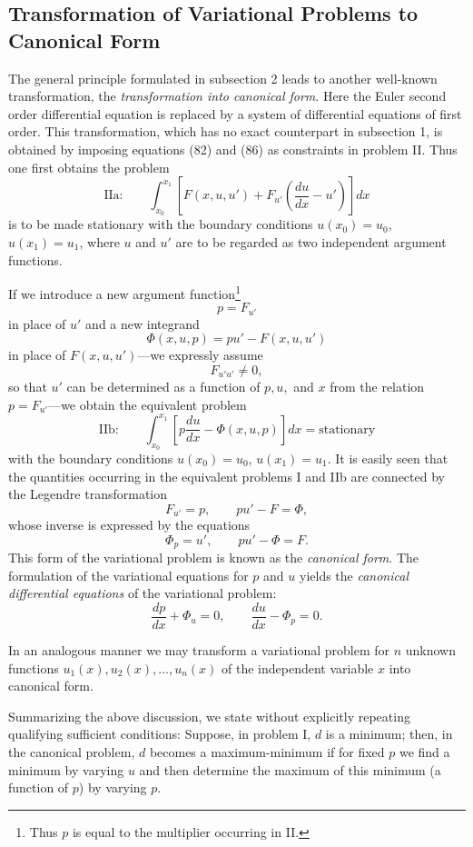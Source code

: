 \subsection{Transformation of Variational Problems to Canonical Form}
The general principle formulated in subsection 2 leads to another well-known transformation, the \emph{transformation into canonical form}. Here the Euler second order differential equation is replaced by a system of differential equations of first order. This transformation, which has no exact counterpart in subsection 1, is obtained by imposing equations (82) and (86) as constraints in problem II. Thus one first obtains the problem
\[
\text{IIa:}\qquad \int_{x_0}^{x_1}\left[F(x,u,u')+F_{u'}\left(\frac{du}{dx}-u'\right)\right]dx
\]
is to be made stationary with the boundary conditions $u(x_0)=u_0$, $u(x_1)=u_1$, where $u$ and $u'$ are to be regarded as two independent argument functions.

If we introduce a new argument function\footnote{Thus $p$ is equal to the multiplier occurring in II.}
\[
p=F_{u'}
\]
in place of $u'$ and a new integrand
\[
\Phi(x,u,p)=pu'-F(x,u,u')
\]
in place of $F(x,u,u')$---we expressly assume
\[
F_{u'u'}\ne0,
\]
so that $u'$ can be determined as a function of $p,u,$ and $x$ from the relation $p=F_{u'}$---we obtain the equivalent problem
\[
\text{IIb:}\qquad \int_{x_0}^{x_1}\left[p\frac{du}{dx}-\Phi(x,u,p)\right]dx=\text{stationary}
\]
with the boundary conditions $u(x_0)=u_0$, $u(x_1)=u_1$. It is easily seen that the quantities occurring in the equivalent problems I and IIb are connected by the Legendre transformation
\[
F_{u'}=p,\qquad pu'-F=\Phi,
\]
whose inverse is expressed by the equations
\[
\Phi_p=u',\qquad pu'-\Phi=F.
\]
This form of the variational problem is known as the \emph{canonical form}. The formulation of the variational equations for $p$ and $u$ yields the \emph{canonical differential equations} of the variational problem:
\[
\frac{dp}{dx}+\Phi_u=0,\qquad \frac{du}{dx}-\Phi_p=0.
\]

In an analogous manner we may transform a variational problem for $n$ unknown functions $u_1(x),u_2(x),\ldots,u_n(x)$ of the independent variable $x$ into canonical form.

Summarizing the above discussion, we state without explicitly repeating qualifying sufficient conditions: Suppose, in problem I, $d$ is a minimum; then, in the canonical problem, $d$ becomes a maximum-minimum if for fixed $p$ we find a minimum by varying $u$ and then determine the maximum of this minimum (a function of $p$) by varying $p$.

